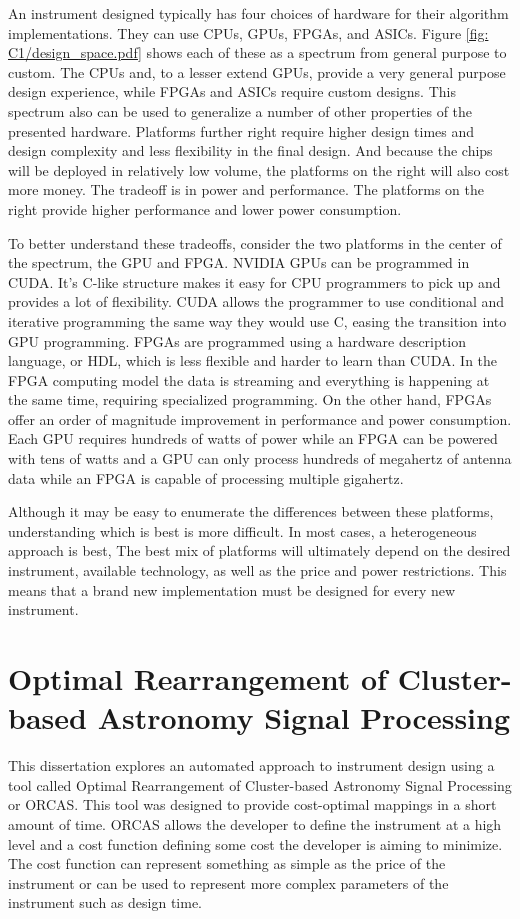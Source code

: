 An instrument designed typically has four choices of hardware for their algorithm implementations. 
They can use CPUs, GPUs, FPGAs, and ASICs.
Figure \ref{fig: C1/design_space.pdf} shows each of these as a spectrum from general purpose to custom.
The CPUs and, to a lesser extend GPUs, provide a very general purpose design experience, while FPGAs and ASICs require custom designs.
This spectrum also can be used to generalize a number of other properties of the presented hardware.
Platforms further right require higher design times and design complexity and less flexibility in the final design.
And because the chips will be deployed in relatively low volume, the platforms on the right will also cost more money. 
The tradeoff is in power and performance. 
The platforms on the right provide higher performance and lower power consumption.

To better understand these tradeoffs, consider the two platforms in the center of the spectrum, the GPU and FPGA.
NVIDIA GPUs can be programmed in CUDA.
It's C-like structure makes it easy for CPU programmers to pick up and provides a lot of flexibility. 
CUDA allows the programmer to use conditional and iterative programming the same way they would use C, easing the transition into GPU programming.
FPGAs are programmed using a hardware description language, or HDL, which is less flexible and harder to learn than CUDA.
In the FPGA computing model the data is streaming and everything is happening at the same time, requiring specialized programming.
On the other hand, FPGAs offer an order of magnitude improvement in performance and power consumption.
Each GPU requires hundreds of watts of power while an FPGA can be powered with tens of watts and a GPU can only process hundreds of megahertz of antenna data while an FPGA is capable of processing multiple gigahertz.

Although it may be easy to enumerate the differences between these platforms, understanding which is best is more difficult.
In most cases, a heterogeneous approach is best, 
The best mix of platforms will ultimately depend on the desired instrument, available technology, as well as the price and power restrictions.
This means that a brand new implementation must be designed for every new instrument.


\section{Optimal Rearrangement of Cluster-based Astronomy Signal Processing}
This dissertation explores an automated approach to instrument design using a tool called Optimal Rearrangement of Cluster-based Astronomy Signal Processing or ORCAS.
This tool was designed to provide cost-optimal mappings in a short amount of time.
ORCAS allows the developer to define the instrument at a high level and a cost function defining some cost the developer is aiming to minimize.
The cost function can represent something as simple as the price of the instrument or can be used to represent more complex parameters of the instrument such as design time.


